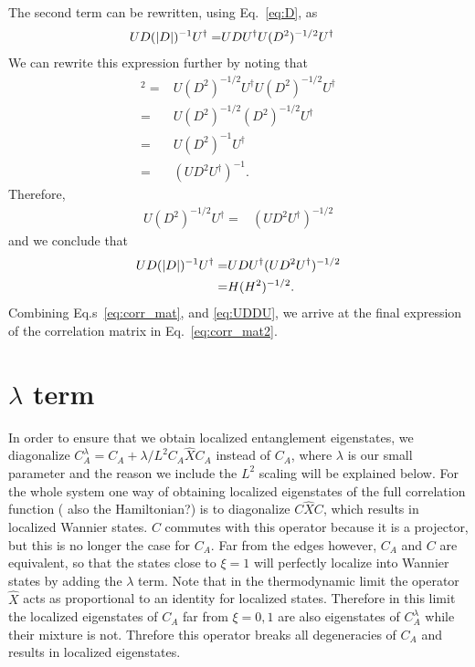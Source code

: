 \documentclass[twocolumn,amsmath,longbibliography,amssymb,superscriptaddress]{revtex4-1}
\newcommand{\carlos}[1]{{\color{red} #1}}
\begin{document}
The second term can be rewritten, using Eq.~\ref{eq:D}, as
\begin{align}
UD(\abs{D})^{-1}U^\dagger =& UDU^\dagger U(D^2)^{-1/2}U^\dagger
\end{align}
We can rewrite this expression further by noting that 
\begin{align}
[U (D^2)^{-1/2} U^\dagger]^2 =& U (D^2)^{-1/2} U^\dagger U  (D^2)^{-1/2} U^\dagger \nonumber\\
=&  U (D^2)^{-1/2}  (D^2)^{-1/2} U^\dagger \nonumber\\
=&  U (D^2)^{-1} U^\dagger \nonumber\\
=&  (U D^2 U^\dagger)^{-1}.
\end{align}
Therefore,
\begin{align*}
U (D^2)^{-1/2} U^\dagger =&(U D^2 U^\dagger)^{-1/2} 
\end{align*}
and we conclude that
\begin{align}\label{eq:UDDU}
UD(\abs{D})^{-1}U^\dagger =& UDU^\dagger(U D^2 U^\dagger)^{-1/2} \nonumber\\ 
=& H(H^2)^{-1/2}.
\end{align}
Combining Eq.s~\eqref{eq:corr_mat},  and \eqref{eq:UDDU}, we arrive at the final expression of the correlation matrix in Eq.~\eqref{eq:corr_mat2}. 


\section{$\lambda$ term}


In order to ensure that we obtain localized entanglement eigenstates,  we diagonalize $C_A^\lambda = C_A + \lambda/L^2 C_A\hat{X}C_A$ instead of $C_A$, where $\lambda$ is our small parameter and the reason we include the $L^2$ scaling will be explained below.
For the whole system one way of obtaining localized eigenstates of the full correlation function (\carlos{also the Hamiltonian?}) is to diagonalize $C\hat{X}C$, which results in localized Wannier states. $C$ commutes with this operator because it is a projector, but this is no longer the case for $C_A$. Far from the edges however, $C_A$ and $C$ are equivalent, so that the states close to $\xi=1$ will perfectly localize into Wannier states by adding the $\lambda$ term. Note that in the thermodynamic limit the operator $\hat{X}$ acts as proportional to an identity for localized states. Therefore in this limit the localized eigenstates of $C_A$ far from $\xi = 0,1$ are also eigenstates of $C_A^\lambda$ while their mixture is not. Threfore this operator breaks all degeneracies of $C_A$ and results in localized eigenstates.
\end{document}
